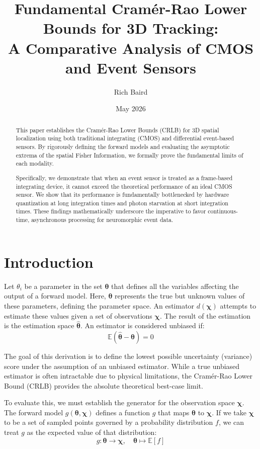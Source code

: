 \documentclass[11pt]{article}
\title{\textbf{Fundamental Cramér-Rao Lower Bounds for 3D Tracking:\\ A Comparative Analysis of CMOS and Event Sensors}}
\author{Rich Baird}
\date{May 2026}
\begin{document}
\maketitle

\begin{abstract}
This paper establishes the Cramér-Rao Lower Bounds (CRLB) for 3D spatial localization using both traditional integrating (CMOS) and differential event-based sensors. By rigorously defining the forward models and evaluating the asymptotic extrema of the spatial Fisher Information, we formally prove the fundamental limits of each modality. 

Specifically, we demonstrate that when an event sensor is treated as a frame-based integrating device, it cannot exceed the theoretical performance of an ideal CMOS sensor. We show that its performance is fundamentally bottlenecked by hardware quantization at long integration times and photon starvation at short integration times. These findings mathematically underscore the imperative to favor continuous-time, asynchronous processing for neuromorphic event data.
\end{abstract}

\section{Introduction}

Let $\theta_i$ be a parameter in the set $\bm{\theta}$ that defines all the variables affecting the output of a forward model. Here, $\bm{\theta}$ represents the true but unknown values of these parameters, defining the parameter space. An estimator $d(\bm{\chi})$ attempts to estimate these values given a set of observations $\bm{\chi}$. The result of the estimation is the estimation space $\hat{\bm{\theta}}$. An estimator is considered unbiased if:
\begin{equation}
\mathbb{E} (\hat{\bm{\theta}} - \bm{\theta}) = 0
\end{equation}

The goal of this derivation is to define the lowest possible uncertainty (variance) score under the assumption of an unbiased estimator. While a true unbiased estimator is often intractable due to physical limitations, the Cramér-Rao Lower Bound (CRLB) provides the absolute theoretical best-case limit.

To evaluate this, we must establish the generator for the observation space $\bm{\chi}$. The forward model $g(\bm{\theta}, \bm{\chi})$ defines a function $g$ that maps $\bm{\theta}$ to $\bm{\chi}$. If we take $\bm{\chi}$ to be a set of sampled points governed by a probability distribution $f$, we can treat $g$ as the expected value of that distribution:
\begin{equation}
g: \bm{\theta} \to \bm{\chi}, \quad \bm{\theta} \mapsto \mathbb{E} \left[f\right]
\end{equation}
\end{document}
